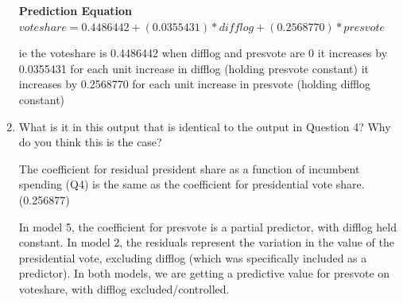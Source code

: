 \documentclass[12pt,letterpaper]{article}
\begin{document}
\begin{enumerate}
  \textbf{Prediction Equation }
   $voteshare = 0.4486442 + (0.0355431) * difflog + (0.2568770) * presvote$

  ie the voteshare is 0.4486442 when difflog and presvote are 0
    it increases by 0.0355431 for each unit increase in difflog
           (holding presvote constant)
    it increases by 0.2568770 for each unit increase in presvote
           (holding difflog constant)

		\item What is it in this output that is identical to the output in Question 4? Why do you think this is the case?
    
    The coefficient for residual president share as a function of incumbent spending (Q4) is the same as the coefficient for presidential vote share.(0.256877)

    In model 5, the coefficient for presvote is a partial predictor, with difflog held constant.  In model 2, the residuals represent the variation in the value of the presidential vote, excluding difflog (which was specifically included as a predictor).  In both models, we are getting a predictive value for presvote on voteshare, with difflog excluded/controlled.

	\end{enumerate}


\newpage

	  
\end{document}
